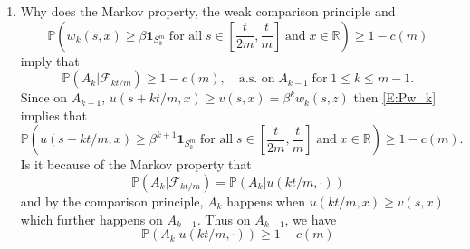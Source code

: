 \documentclass{article}
\numberwithin{equation}{section}
\newcommand{\R}{\mathbb{R}}
\begin{document}
\begin{enumerate}
	\item
Why does the Markov property, the weak comparison principle and
	\begin{equation} \label{E:Pw_k}
		\mathbb{P}\left( w_k(s,x) \ge \beta \textbf{1}_{S_{k}^m} \; \text{for all} \; s \in \left[ \frac{t}{2m}, \frac{t}{m}\right]  \; \text{and} \; x \in \R  \right) \ge 1 - c(m)
	\end{equation}
imply that
	\[
		\mathbb{P}(A_k | \mathcal{F}_{kt/m}) \ge 1 - c(m), \quad \text{a.s. on} \; A_{k-1} \; \text{for} \; 1 \le k \le m-1.
	\]
Since on $A_{k-1}$, $u(s + kt/m, x) \ge v(s,x) = \beta^k w_k(s,z)$ then \eqref{E:Pw_k} implies that
	\[
		\mathbb{P}\left( u(s + kt/m,x) \ge \beta^{k+1} \textbf{1}_{S_{k}^m} \; \text{for all} \; s \in \left[ \frac{t}{2m}, \frac{t}{m}\right]  \; \text{and} \; x \in \R  \right) \ge 1 - c(m).
	\]
Is it because of the Markov property that
	\[
		\mathbb{P}(A_k | \mathcal{F}_{kt/m}) = \mathbb{P}(A_k | u(kt/m,\cdot))
	\]
and by the comparison principle, $A_k$ happens when $u(kt/m,x) \ge v(s,x)$ which further happens on $A_{k-1}$. Thus on $A_{k-1}$, we have
	\[
		\mathbb{P}(A_k | u(kt/m,\cdot)) \ge 1 - c(m)
	\]
\end{enumerate}
\end{document}
